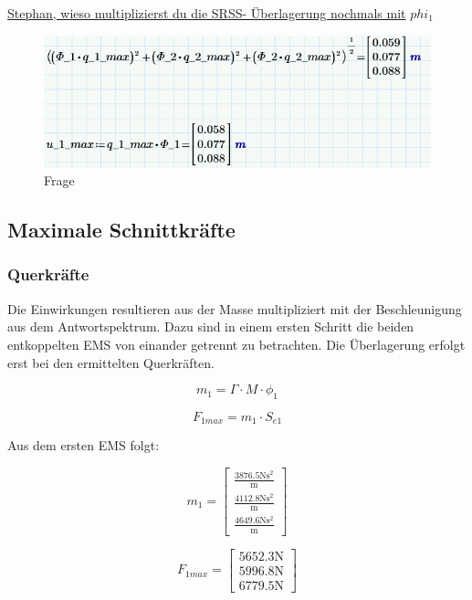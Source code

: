 \documentclass[
  letterpaper,
  DIV=11]{scrreprt}
\begin{document}
\ul{Stephan, wieso multiplizierst du die SRSS- Überlagerung nochmals
mit} \(phi_1\)

\begin{figure}[H]

{\centering \includegraphics{bilder/Frage_1.png}

}

\caption{Frage}

\end{figure}

\hypertarget{maximale-schnittkruxe4fte}{%
\subsection{Maximale Schnittkräfte}\label{maximale-schnittkruxe4fte}}

\hypertarget{querkruxe4fte}{%
\subsubsection{Querkräfte}\label{querkruxe4fte}}

Die Einwirkungen resultieren aus der Masse multipliziert mit der
Beschleunigung aus dem Antwortspektrum. Dazu sind in einem ersten
Schritt die beiden entkoppelten EMS von einander getrennt zu betrachten.
Die Überlagerung erfolgt erst bei den ermittelten Querkräften.

\[
m_1 = \Gamma \cdot M \cdot \phi_1
\]

\[
F_{1max} = m_1 \cdot S_{e1}
\]

Aus dem ersten EMS folgt:

\begin{equation}m_{1} = \left[\begin{matrix}\frac{3876.5 \text{N} \text{s}^{2}}{\text{m}}\\\frac{4112.8 \text{N} \text{s}^{2}}{\text{m}}\\\frac{4649.6 \text{N} \text{s}^{2}}{\text{m}}\end{matrix}\right]\end{equation}

\begin{equation}F_{1 max} = \left[\begin{matrix}5652.3 \text{N}\\5996.8 \text{N}\\6779.5 \text{N}\end{matrix}\right]\end{equation}
\end{document}
